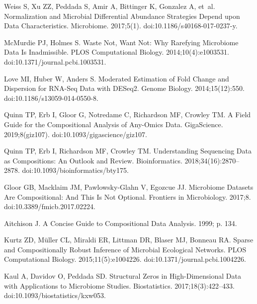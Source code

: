 \documentclass[10pt,letterpaper]{article}
\begin{document}
\begin{thebibliography}{10}
    Weiss S, Xu ZZ, Peddada S, Amir A, Bittinger K, Gonzalez A, et~al.
    \newblock Normalization and Microbial Differential Abundance Strategies Depend
      upon Data Characteristics.
    \newblock Microbiome. 2017;5(1).
    \newblock doi:{10.1186/s40168-017-0237-y}.
    
    McMurdie PJ, Holmes S.
    \newblock Waste {{Not}}, {{Want Not}}: {{Why Rarefying Microbiome Data Is
      Inadmissible}}.
    \newblock PLOS Computational Biology. 2014;10(4):e1003531.
    \newblock doi:{10.1371/journal.pcbi.1003531}.
    
    Love MI, Huber W, Anders S.
    \newblock Moderated Estimation of Fold Change and Dispersion for {{RNA}}-Seq
      Data with {{DESeq2}}.
    \newblock Genome Biology. 2014;15(12):550.
    \newblock doi:{10.1186/s13059-014-0550-8}.
    
    Quinn TP, Erb I, Gloor G, Notredame C, Richardson MF, Crowley TM.
    \newblock A Field Guide for the Compositional Analysis of Any-Omics Data.
    \newblock GigaScience. 2019;8(giz107).
    \newblock doi:{10.1093/gigascience/giz107}.
    
    Quinn TP, Erb I, Richardson MF, Crowley TM.
    \newblock Understanding Sequencing Data as Compositions: An Outlook and Review.
    \newblock Bioinformatics. 2018;34(16):2870--2878.
    \newblock doi:{10.1093/bioinformatics/bty175}.
    
    Gloor GB, Macklaim JM, {Pawlowsky-Glahn} V, Egozcue JJ.
    \newblock Microbiome {{Datasets Are Compositional}}: {{And This Is Not
      Optional}}.
    \newblock Frontiers in Microbiology. 2017;8.
    \newblock doi:{10.3389/fmicb.2017.02224}.
    
    Aitchison J.
    \newblock A {{Concise Guide}} to {{Compositional Data Analysis}}. 1999; p. 134.
    
    Kurtz ZD, M{\"u}ller CL, Miraldi ER, Littman DR, Blaser MJ, Bonneau RA.
    \newblock Sparse and {{Compositionally Robust Inference}} of {{Microbial
      Ecological Networks}}.
    \newblock PLOS Computational Biology. 2015;11(5):e1004226.
    \newblock doi:{10.1371/journal.pcbi.1004226}.
    
    Kaul A, Davidov O, Peddada SD.
    \newblock Structural Zeros in High-Dimensional Data with Applications to
      Microbiome Studies.
    \newblock Biostatistics. 2017;18(3):422--433.
    \newblock doi:{10.1093/biostatistics/kxw053}.
    

\end{thebibliography}
\end{document}
